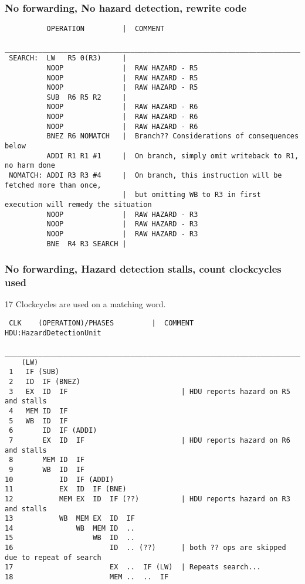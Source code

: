 \documentclass[a4paper,10pt]{article}
\begin{document}
\subsubsection{No forwarding, No hazard detection, rewrite code}
\begin{verbatim}
          OPERATION         |  COMMENT
 ________________________________________________________________________________________________
 SEARCH:  LW   R5 0(R3)     |
          NOOP              |  RAW HAZARD - R5
          NOOP              |  RAW HAZARD - R5
          NOOP              |  RAW HAZARD - R5
          SUB  R6 R5 R2     |
          NOOP              |  RAW HAZARD - R6
          NOOP              |  RAW HAZARD - R6
          NOOP              |  RAW HAZARD - R6
          BNEZ R6 NOMATCH   |  Branch?? Considerations of consequences below
          ADDI R1 R1 #1     |  On branch, simply omit writeback to R1, no harm done
 NOMATCH: ADDI R3 R3 #4     |  On branch, this instruction will be fetched more than once,
                            |  but omitting WB to R3 in first execution will remedy the situation
          NOOP              |  RAW HAZARD - R3
          NOOP              |  RAW HAZARD - R3
          NOOP              |  RAW HAZARD - R3
          BNE  R4 R3 SEARCH |
\end{verbatim}

\newpage
\subsubsection{No forwarding, Hazard detection stalls, count clockcycles used}

17 Clockcycles are used on a matching word.
\begin{verbatim}
 CLK    (OPERATION)/PHASES         |  COMMENT   HDU:HazardDetectionUnit
 ________________________________________________________________________________________________
    (LW)  
 1   IF (SUB)
 2   ID  IF (BNEZ) 
 3   EX  ID  IF                           | HDU reports hazard on R5 and stalls
 4   MEM ID  IF     
 5   WB  ID  IF 
 6       ID  IF (ADDI)
 7       EX  ID  IF                       | HDU reports hazard on R6 and stalls
 8       MEM ID  IF    
 9       WB  ID  IF  
10           ID  IF (ADDI)
11           EX  ID  IF (BNE)
12           MEM EX  ID  IF (??)          | HDU reports hazard on R3 and stalls
13           WB  MEM EX  ID  IF           
14               WB  MEM ID  ..   
15                   WB  ID  .. 
16                       ID  .. (??)      | both ?? ops are skipped due to repeat of search
17                       EX  ..  IF (LW)  | Repeats search...
18                       MEM ..  ..  IF   
\end{verbatim}
\end{document}
